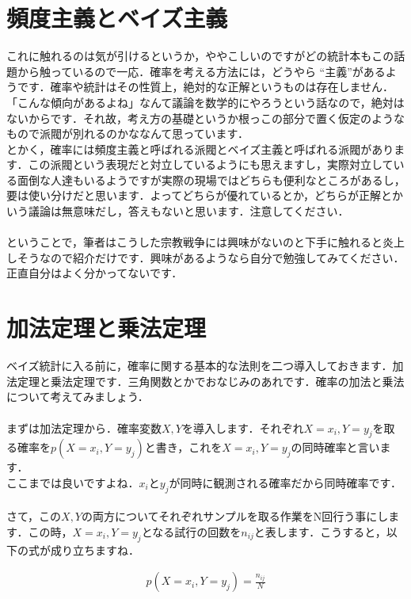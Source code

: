 \documentclass[11pt,a4paper,uplatex]{ujreport} 	%
\begin{document}
\section{頻度主義とベイズ主義}
これに触れるのは気が引けるというか，ややこしいのですがどの統計本もこの話題から触っているので一応．確率を考える方法には，どうやら ``主義''があるようです．確率や統計はその性質上，絶対的な正解というものは存在しません．「こんな傾向があるよね」なんて議論を数学的にやろうという話なので，絶対はないからです．それ故，考え方の基礎というか根っこの部分で置く仮定のようなもので派閥が別れるのかななんて思っています．\\

とかく，確率には頻度主義と呼ばれる派閥とベイズ主義と呼ばれる派閥があります．この派閥という表現だと対立しているようにも思えますし，実際対立している面倒な人達もいるようですが実際の現場ではどちらも便利なところがあるし，要は使い分けだと思います．よってどちらが優れているとか，どちらが正解とかいう議論は無意味だし，答えもないと思います．注意してください．\\
\\

ということで，筆者はこうした宗教戦争には興味がないのと下手に触れると炎上しそうなので紹介だけです．興味があるようなら自分で勉強してみてください．正直自分はよく分かってないです．

\section{加法定理と乗法定理}
ベイズ統計に入る前に，確率に関する基本的な法則を二つ導入しておきます．加法定理と乗法定理です．三角関数とかでおなじみのあれです．確率の加法と乗法について考えてみましょう．\\
\\

まずは加法定理から．確率変数$X,Y$を導入します．それぞれ$X=x_i, Y=y_j$を取る確率を$p(X=x_i, Y=y_j)$と書き，これを$X=x_i, Y=y_j$の同時確率と言います．\\

ここまでは良いですよね．$x_iとy_j$が同時に観測される確率だから同時確率です．\\
\\

さて，この$X, Y$の両方についてそれぞれサンプルを取る作業をN回行う事にします．この時，$X=x_i, Y=y_j$となる試行の回数を$n_{ij}$と表します．こうすると，以下の式が成り立ちますね．

\begin{align}
\label{eq:prob1}
p(X=x_i, Y=y_j) = \frac{n_{ij}}{N}
\end{align}
\end{document}
